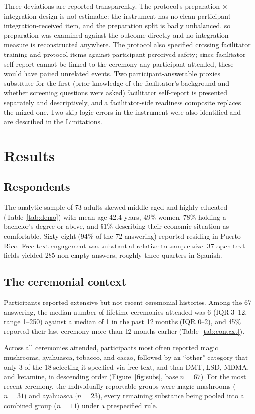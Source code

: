 \documentclass[12pt]{article}
\begin{document}
Three deviations are reported transparently. The protocol's preparation $\times$ integration design
is not estimable: the instrument has no clean participant integration-received item, and the preparation
split is badly unbalanced, so preparation was examined against the outcome directly and no integration
measure is reconstructed anywhere. The protocol also specified crossing facilitator training and protocol
items against participant-perceived safety; since facilitator self-report cannot be linked to the ceremony
any participant attended, these would have paired unrelated events. Two participant-answerable proxies
substitute for the first (prior knowledge of the facilitator's background and whether screening questions
were asked) facilitator self-report is presented separately and descriptively, and a facilitator-side
readiness composite replaces the mixed one. Two skip-logic errors in the instrument were also identified
and are described in the Limitations.

\section{Results}

\subsection{Respondents}

The analytic sample of 73 adults skewed middle-aged and highly educated (Table~\ref{tab:demo}) with mean age
42.4 years, 49\% women, 78\% holding a bachelor's degree or above, and 61\% describing their economic
situation as comfortable. Sixty-eight (94\% of the 72 answering) reported residing in Puerto Rico. Free-text
engagement was substantial relative to sample size: 37 open-text fields yielded 285 non-empty answers,
roughly three-quarters in Spanish.

\subsection{The ceremonial context}

Participants reported extensive but not recent ceremonial histories. Among the 67 answering, the median
number of lifetime ceremonies attended was 6 (IQR 3--12, range 1--250) against a median of 1 in the past 12
months (IQR 0--2), and 45\% reported their last ceremony more than 12 months earlier
(Table~\ref{tab:context}).

Across all ceremonies attended, participants most often reported magic mushrooms, ayahuasca, tobacco, and
cacao, followed by an ``other'' category that only 3 of the 18 selecting it specified via free text, and
then DMT, LSD, MDMA, and ketamine, in descending order (Figure~\ref{fig:subs}, base $n=67$). For the most
recent ceremony, the individually reportable groups were magic mushrooms ($n=31$) and ayahuasca ($n=23$),
every remaining substance being pooled into a combined group ($n=11$) under a prespecified rule.
\end{document}
